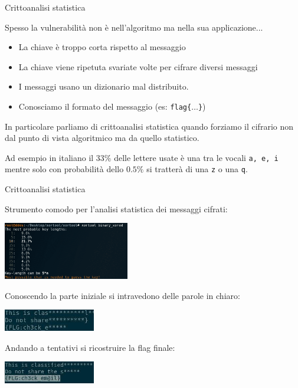 \documentclass[xcolor=dvipsnames,aspectratio=169]{beamer}
\begin{document}
\begin{frame}{Crittoanalisi statistica}

  \pause
  
  Spesso la vulnerabilità non è nell'algoritmo ma nella sua applicazione...
  
  \pause

  \medskip

  \begin{itemize}
    \item La chiave è troppo corta rispetto al messaggio
    \item La chiave viene ripetuta svariate volte per cifrare diversi messaggi
    \item I messaggi usano un dizionario mal distribuito.
    \item Conosciamo il formato del messaggio (es: \texttt{flag\{$\ldots$\}})
  \end{itemize}
  
  \medskip
  
  \pause

  In particolare parliamo di crittoanalisi statistica quando forziamo il cifrario non dal punto di vista algoritmico ma da quello statistico.
  
  \pause

  Ad esempio in italiano il $33\%$ delle lettere usate è una tra le vocali \texttt{a, e, i} mentre solo con probabilità dello $0.5\%$ si tratterà di una \texttt{z} o una \texttt{q}.


\end{frame}

\begin{frame}{Crittoanalisi statistica}
  
  \centering
  
  Strumento comodo per l'analisi statistica dei messaggi cifrati:

  \includegraphics[width=5.5cm]{img/xortool} 

  \pause
  
  Conoscendo la parte iniziale si intravedono delle parole in chiaro:
   
  \centering\includegraphics[width=4cm]{img/xor1} 

  Andando a tentativi si ricostruire la flag finale:
  
  
  \centering\includegraphics[width=4cm]{img/xor2} 
  
\end{frame}
\end{document}
